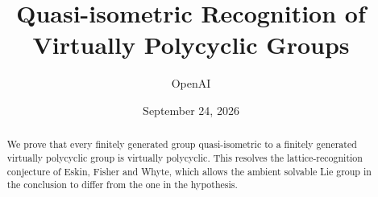 \documentclass[11pt]{article}
\title{Quasi-isometric Recognition of\\Virtually Polycyclic Groups}
\author{OpenAI}
\date{September 24, 2026}
\numberwithin{equation}{section}
\theoremstyle{definition}
\begin{document}
\maketitle
\begin{abstract}
We prove that every finitely generated group quasi-isometric to a finitely
generated virtually polycyclic group is virtually polycyclic. This resolves
the lattice-recognition conjecture of Eskin, Fisher and Whyte, which allows
the ambient solvable Lie group in the conclusion to differ from the one in
the hypothesis.
\end{abstract}
\tableofcontents











\appendix



\end{document}
